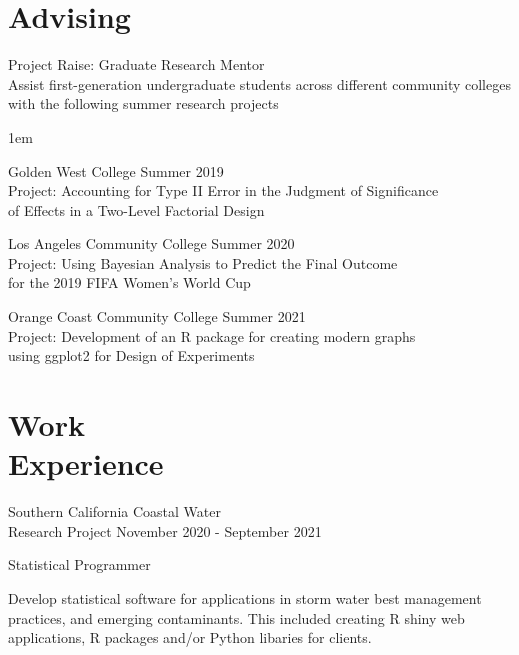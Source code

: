 \documentclass[margin,line]{res}
\newenvironment{list1}{
  \begin{list}{\ding{113}}{
      \setlength{\itemsep}{0in}
      \setlength{\parsep}{0in} \setlength{\parskip}{0in}
      \setlength{\topsep}{0in} \setlength{\partopsep}{0in} 
      \setlength{\leftmargin}{0.20in}}}{\end{list}}
\begin{document}
\begin{resume}
\section{\sc Advising}


{\sc Project Raise: Graduate Research Mentor}\\[5pt]
Assist first-generation undergraduate students across different community colleges with the
following summer research projects \\[4pt]
\begin{list1}
\itemsep1em
\item[] {\sc Golden West College} \hfill Summer 2019 \\[3pt]
Project: Accounting for Type II Error in the Judgment of Significance \\[3pt]
of Effects 
in a Two-Level Factorial Design
\item[] {\sc Los Angeles Community College} \hfill Summer 2020 \\[3pt]
Project: Using Bayesian Analysis to Predict the Final Outcome  \\[3pt]
for the 2019 
FIFA Women's World Cup
\item[] {\sc Orange Coast Community College} \hfill Summer 2021 \\[3pt]
Project: Development of an R package for creating modern graphs \\[3pt]
using ggplot2 for 
Design of Experiments
\end{list1}



\vspace{2ex}


\section{\sc Work \\ Experience}
{\sc Southern California Coastal Water\\ Research Project} \hfill {November 2020 - September 2021}\\
\vspace*{-.12in}
\begin{list1}
\itemsep3pt
\item[] Statistical Programmer \\
\vskip -6pt

Develop statistical software for applications in storm water best management practices, and emerging contaminants. This included creating R shiny web applications, R packages and/or Python libaries for clients.
\end{list1}


\end{resume}
\end{document}
